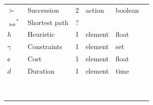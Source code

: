 \documentclass[11pt,a4paper,twoside,openright,titlepage,numbers=noenddot,headinclude,cleardoublepage=empty,openany]{scrreprt}
\theoremstyle{plain}
\theoremstyle{definition}
\theoremstyle{remark}
\begin{document}
\begin{table}
\begin{tabular}{@{}llllll@{}}
\(\succ\) & Succession & 2 & action & boolean &  \\
\(\Mapsto^*\) & Shortest path & ? &  &  &  \\
\(h\) & Heuristic & 1 & element & float &  \\
\(\gamma\) & Constraints & 1 & element & set &  \\
\(¢\) & Cost & 1 & element & float &  \\
\(d\) & Duration & 1 & element & time &  \\
 &  &  &  &  &  \\
 &  &  &  &  &  \\
 &  &  &  &  &  \\
 &  &  &  &  &  \\
 &  &  &  &  &  \\
 &  &  &  &  &  \\
 &  &  &  &  &  \\
 &  &  &  &  &  \\
 &  &  &  &  &  \\

\bottomrule
\end{tabular}

\end{table}
\end{document}
